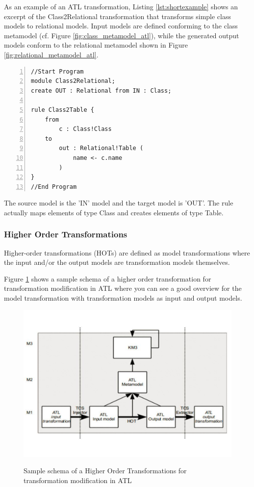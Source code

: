 \documentclass{llncs}
\begin{document}
As an example of an ATL transformation, Listing \ref{lst:shortexample} shows an
excerpt of the Class2Relational transformation that transforms simple class models to
relational models. Input models are defined conforming to the class metamodel
(cf. Figure \ref{fig:class_metamodel_atl}), while the generated output models
conform to the relational metamodel shown in Figure \ref{fig:relational_metamodel_atl}.

\begin{lstlisting}[language=ATL, numbers=left,xleftmargin=5.0ex, caption=Simple example for a ATL transformation, label=lst:shortexample]
//Start Program
module Class2Relational;
create OUT : Relational from IN : Class;

rule Class2Table {
	from
		c : Class!Class
	to 
		out : Relational!Table (
			name <- c.name
		)
}
//End Program
\end{lstlisting}

The source model is the 'IN' model and the target model is 'OUT'. The rule actually maps elements of type Class and creates elements of type Table.

\subsubsection{Higher Order Transformations}

Higher-order transformations (HOTs) are defined as model transformations where the input and/or the output models are transformation models themselves.\cite{Tisi:2009}

Figure \ref{fig:samplefigure_pdf} shows a sample schema of a higher order transformation for transformation modification
in ATL where you can see a good overview for the model transformation with transformation models as input and output models.

 \begin{figure}
	\centering
	\includegraphics[width=1\textwidth,natwidth=610,natheight=642]{figures/HOT.pdf}
	\caption{Sample schema of a Higher Order Transformations for transformation modification in
	ATL}\cite{misc:ModelingLanguages}
	\label{fig:samplefigure_pdf}
\end{figure}~\cite{misc:ModelingLanguages}
\end{document}
